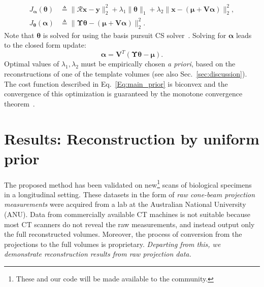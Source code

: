 \documentclass[journal]{IEEEtran}
\begin{document}
\begin{align}
J_{\boldsymbol{\alpha}}(\boldsymbol{\theta}) &\triangleq \lVert\boldsymbol{\mathcal{R} x- y}\rVert_2^2  + \lambda_1\lVert\boldsymbol{\theta}\rVert_1+\lambda_2\lVert\boldsymbol{x} - (\boldsymbol{\mu + V\alpha})\rVert_2^2, \\
J_{\boldsymbol\theta}(\boldsymbol{\alpha}) &\triangleq \lVert\boldsymbol{\Upsilon\theta} - (\boldsymbol{\mu + V\alpha})\rVert_2^2.
\end{align}
Note that $\boldsymbol{\theta}$ is solved for using the basis pursuit CS solver~\cite{l1ls}. Solving for $\boldsymbol{\alpha}$ leads to the closed form update:
\begin{equation}
\boldsymbol{\boldsymbol{\alpha}} = \boldsymbol{V}^T(\boldsymbol{\Upsilon \theta} -\boldsymbol{\mu}).
\end{equation}
 Optimal values of $\lambda_1, \lambda_2$ must be empirically chosen \textit{a priori}, based on the reconstructions of one of the template volumes (see also Sec.~\ref{sec:discussion}). The cost function described in Eq.~\ref{Eq:main_prior} is biconvex and the convergence of this optimization is guaranteed by the monotone convergence theorem~\cite{monotone}.
 \vspace{2mm}

 \section{Results: Reconstruction by uniform prior}
 \label{sec:results_uniform_prior}

 
 The proposed method has been validated on new\footnote {These and our
   code will be made available to the community.} scans of biological
 specimens in a longitudinal setting. These datasets in the form of
 \emph{raw cone-beam projection measurements} were acquired from a lab
 at the Australian National University (ANU). Data from commercially
 available CT machines is not suitable because most CT scanners do
 not reveal the raw measurements, and instead output only the full
 reconstructed volumes. Moreover, the process of conversion from the
 projections to the full volumes is proprietary.
 \emph{Departing from this, we
   demonstrate reconstruction results from raw projection data.}
\end{document}
